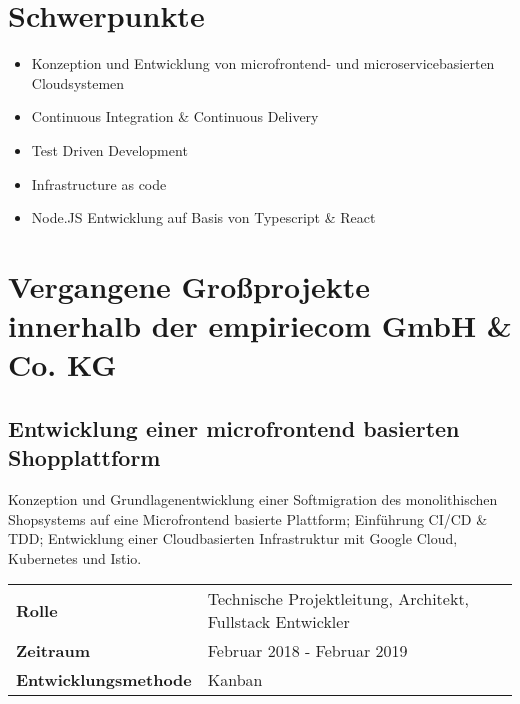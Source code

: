 \documentclass[10pt,ngerman,a4paper]{article}
\begin{document}
\section{Schwerpunkte}
\begin{itemize}
\item Konzeption und Entwicklung von microfrontend- und microservicebasierten Cloudsystemen
\item Continuous Integration \& Continuous Delivery
\item Test Driven Development
\item Infrastructure as code
\item Node.JS Entwicklung auf Basis von Typescript \& React
\end{itemize}



\section{Vergangene Großprojekte innerhalb der empiriecom GmbH \& Co. KG}
\subsection{Entwicklung einer microfrontend basierten Shopplattform}
Konzeption und Grundlagenentwicklung einer Softmigration des monolithischen Shopsystems auf eine Microfrontend basierte Plattform; Einführung CI/CD \& TDD; Entwicklung einer Cloudbasierten Infrastruktur mit Google Cloud, Kubernetes und Istio.

\begin{tabular}{ll}
\textbf{Rolle} & Technische Projektleitung, Architekt, Fullstack Entwickler\\
\textbf{Zeitraum} & Februar 2018 - Februar 2019\\
\textbf{Entwicklungsmethode} & Kanban
\end{tabular}
\end{document}
